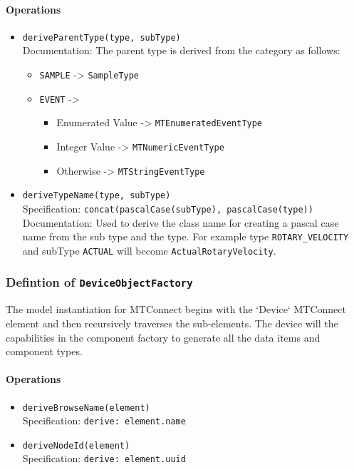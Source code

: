 \paragraph{Operations}
\begin{itemize}
  \item \texttt{deriveParentType(type, subType)}\\
    Documentation: The parent type is derived from the category as follows: 

\begin{itemize}
  \item \texttt{SAMPLE} -> \texttt{SampleType}
  \item \texttt{EVENT} ->
  \begin{itemize}
   \item Enumerated Value -> \texttt{MTEnumeratedEventType}
   \item Integer Value -> \texttt{MTNumericEventType}
   \item Otherwise -> \texttt{MTStringEventType}
  \end{itemize}
\end{itemize}

  \item \texttt{deriveTypeName(type, subType)}\\
    Specification: \texttt{concat(pascalCase(subType), pascalCase(type))}
\\
    Documentation: Used to derive the class name for creating a pascal case name from the sub type and the type. 
For example type \texttt{ROTARY_VELOCITY} and subType \texttt{ACTUAL} will become \texttt{ActualRotaryVelocity}.

\end{itemize}
\subsubsection{Defintion of \texttt{DeviceObjectFactory}} \label{type:DeviceObjectFactory}

\FloatBarrier

The model instantiation for MTConnect begins with the `Device` MTConnect element and then recursively traverses the sub-elements. The device will the capabilities in the component factory to generate all the data items and component types. 

\paragraph{Operations}
\begin{itemize}
  \item \texttt{deriveBrowseName(element)}\\
    Specification: \texttt{derive: element.name}

  \item \texttt{deriveNodeId(element)}\\
    Specification: \texttt{derive: element.uuid}

\end{itemize}
